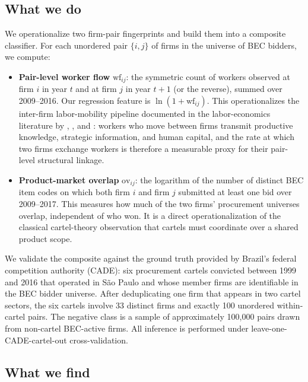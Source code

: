 \subsection*{What we do}

We operationalize two firm-pair fingerprints and build them into a composite classifier. For each unordered pair $\{i, j\}$ of firms in the universe of BEC bidders, we compute:

\begin{itemize}
\item \textbf{Pair-level worker flow} $\mathrm{wf}_{ij}$: the symmetric count of workers observed at firm $i$ in year $t$ and at firm $j$ in year $t+1$ (or the reverse), summed over 2009--2016. Our regression feature is $\ln(1 + \mathrm{wf}_{ij})$. This operationalizes the inter-firm labor-mobility pipeline documented in the labor-economics literature by \citet{stoyanov2012worker}, \citet{jarosch2021learning}, and \citet{sorkin2018ranking}: workers who move between firms transmit productive knowledge, strategic information, and human capital, and the rate at which two firms exchange workers is therefore a measurable proxy for their pair-level structural linkage.

\item \textbf{Product-market overlap} $\mathrm{ov}_{ij}$: the logarithm of the number of distinct BEC item codes on which both firm $i$ and firm $j$ submitted at least one bid over 2009--2017. This measures how much of the two firms' procurement universes overlap, independent of who won. It is a direct operationalization of the classical cartel-theory observation \citep{stigler1964theory, green1984noncooperative} that cartels must coordinate over a shared product scope.
\end{itemize}

We validate the composite against the ground truth provided by Brazil's federal competition authority (CADE): six procurement cartels convicted between 1999 and 2016 that operated in S\~{a}o Paulo and whose member firms are identifiable in the BEC bidder universe. After deduplicating one firm that appears in two cartel sectors, the six cartels involve 33 distinct firms and exactly 100 unordered within-cartel pairs. The negative class is a sample of approximately 100{,}000 pairs drawn from non-cartel BEC-active firms. All inference is performed under leave-one-CADE-cartel-out cross-validation.

\subsection*{What we find}

